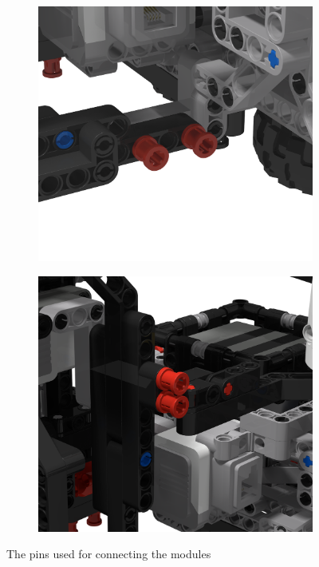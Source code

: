 \documentclass{report}
\begin{document}
\begin{figure}[H]
\begin{subfigure}[b]{0.25\textwidth}
			\includegraphics[width=\textwidth]{Resources/Images/rdrModulePins2.png}
			\label{fig:rdrModulePins2}
		\end{subfigure}
		\hspace{10mm}
		\begin{subfigure}[b]{0.25\textwidth}
			\includegraphics[width=\textwidth]{Resources/Images/rdrModulePins3.png}
			\label{fig:rdrModulePins3}
		\end{subfigure}
		\caption{The pins used for connecting the modules}
		\label{fig:rdrModulePins}
	\end{figure}
	
\end{document}
